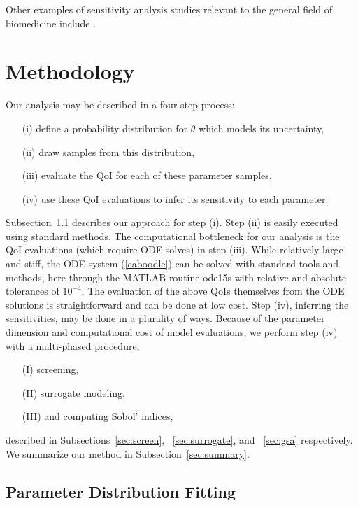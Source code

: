 \documentclass[smallextended]{svjour3}
\numberwithin{equation}{section}
\begin{document}
Other examples of sensitivity analysis studies relevant to the general field of biomedicine include \cite{gsa_pharm,lr_gsa,uqpy,Witthoft2013}.
  
\section{Methodology}\label{sec:meth}

Our analysis may be described in a four step process:
\begin{enumerate}
\item[(i)] define a probability distribution for $\theta$ which models its uncertainty,
\item[(ii)] draw samples from this distribution, 
\item[(iii)] evaluate the QoI for each of these parameter samples,
\item[(iv)] use these QoI evaluations to infer its sensitivity to each parameter. 
\end{enumerate}
Subsection~\ref{sec:param_dist_fit} describes our approach for step (i). Step (ii) is easily executed using standard methods. The computational bottleneck for our analysis is the QoI evaluations (which require ODE solves) in step (iii). While relatively large and stiff, the ODE system (\ref{caboodle}) can be  solved with standard tools and methods, here through the MATLAB routine ode15s with relative and absolute tolerances of $10^{-4}$. The evaluation of the above QoIs themselves from the ODE solutions is straightforward and can be done at low cost. Step (iv), inferring the sensitivities, may be done in a plurality of ways. Because of the parameter dimension and computational cost of model evaluations, we perform step (iv) with a multi-phased procedure,
\begin{enumerate}
\item[(I)] screening,
\item[(II)] surrogate modeling,
 \item[(III)] and computing Sobol' indices,
 \end{enumerate}
 described in Subsections~\ref{sec:screen}, ~\ref{sec:surrogate}, and ~\ref{sec:gsa} respectively. We summarize our method in Subsection~\ref{sec:summary}.

\subsection{Parameter Distribution Fitting}
\label{sec:param_dist_fit}
\end{document}
